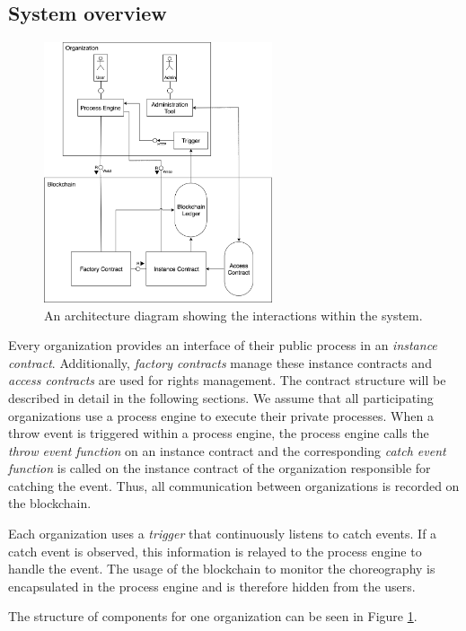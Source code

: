 \documentclass[runningheads]{llncs}
\begin{document}
\subsection{System overview}
\begin{figure}
	\centering
	\includegraphics[width=0.6\textwidth]{fig/system_diagram.eps}
	\caption{An architecture diagram showing the interactions within the system.}
	\label{fig:system_diagram}
\end{figure}

Every organization provides an interface of their public process in an \emph{instance contract}.
Additionally, \emph{factory contracts} manage these instance contracts and \emph{access contracts} are used for rights management.
The contract structure will be described in detail in the following sections.
We assume that all participating organizations use a process engine to execute their private processes.
When a throw event is triggered within a process engine, the process engine calls the \emph{throw event function} on an instance contract and the corresponding \emph{catch event function} is called on the instance contract of the organization responsible for catching the event.
Thus, all communication between organizations is recorded on the blockchain.

Each organization uses a \emph{trigger} that continuously listens to catch events.
If a catch event is observed, this information is relayed to the process engine to handle the event.
The usage of the blockchain to monitor the choreography is encapsulated in the process engine and is therefore hidden from the users.

The structure of components for one organization can be seen in Figure \ref{fig:system_diagram}.
\end{document}
